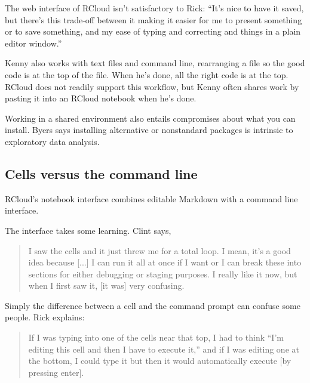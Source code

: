 The web interface of RCloud isn't satisfactory to Rick: ``It's nice to have
it saved, but there's this trade-off between it making it easier for me to
present something or to save something, and my ease of typing and
correcting and things in a plain editor window.''

Kenny also works with text files and command line, rearranging a file so the
good code is at the top of the file. When he's done, all the right code is
at the top. RCloud does not readily support this workflow, but Kenny
often shares work by pasting it into an RCloud notebook when he's done.


Working in a shared environment also entails compromises about what you can
install. Byers says installing alternative or nonstandard packages is
intrinsic to exploratory data analysis.

\subsection{Cells versus the command line}
RCloud's notebook interface combines editable Markdown with a command line
interface.

The interface takes some learning. Clint says,
\begin{quote}
I saw the cells and it just threw me
for a total loop. I mean, it's a good idea because [...] I can run it all at
once if I want or I can break these into sections for either debugging or
staging purposes. I really like it now, but when I first saw it, [it was] very
confusing.
\end{quote}

Simply the difference between a cell and the command prompt can confuse some people.
Rick explains:
\begin{quote}
If I was typing into one of the cells near that top, I had to think ``I'm editing
this cell and then I have to execute it,'' and if I was editing one at the bottom,
I could type it but then it would automatically execute [by pressing enter].
\end{quote}

